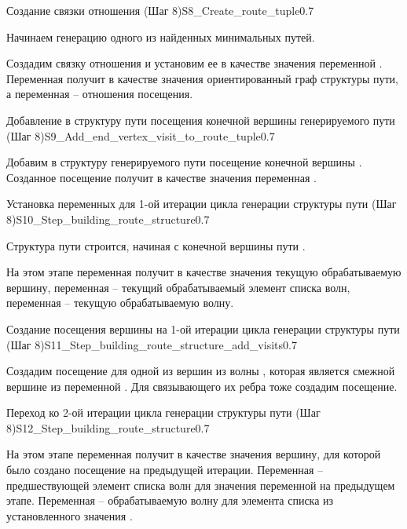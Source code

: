 \begin{algostep}{Создание связки отношения  (Шаг
    8)}{S8_Create_route_tuple}{0.7}
 
  Начинаем генерацию одного из найденных минимальных путей.

  Создадим связку отношения  и установим ее в качестве
  значения переменной . Переменная 
  получит в качестве значения ориентированный граф структуры пути, а
  переменная  – отношения посещения.
\end{algostep}


\begin{algostep}{Добавление в структуру пути посещения конечной
    вершины генерируемого пути (Шаг
    8)}{S9_Add_end_vertex_visit_to_route_tuple}{0.7}
 
  Добавим в структуру генерируемого пути посещение конечной вершины
  . Созданное посещение получит в качестве значения переменная
  .
\end{algostep}


\begin{algostep}{Установка переменных для 1-ой итерации цикла генерации
    структуры пути (Шаг 8)}{S10_Step_building_route_structure}{0.7}
  
  Структура пути строится, начиная с конечной вершины пути .

  На этом этапе переменная  получит в качестве
  значения текущую обрабатываемую вершину, переменная 
  – текущий обрабатываемый элемент списка волн, переменная
   – текущую обрабатываемую волну.
\end{algostep}


\begin{algostep}{Создание посещения вершины на 1-ой итерации цикла
    генерации структуры пути (Шаг
    8)}{S11_Step_building_route_structure_add_visits}{0.7}
 
  Создадим посещение для одной из вершин из волны ,
  которая является смежной вершине из переменной
  . Для связывающего их ребра тоже создадим
  посещение.
\end{algostep}  


\begin{algostep}{Переход ко 2-ой итерации цикла генерации структуры
    пути (Шаг 8)}{S12_Step_building_route_structure}{0.7}
 
  На этом этапе переменная  получит в качестве
  значения вершину, для которой было создано посещение на предыдущей
  итерации. Переменная  – предшествующей элемент
  списка волн для значения переменной  на предыдущем
  этапе. Переменная  – обрабатываемую волну для
  элемента списка из установленного значения .
\end{algostep}



